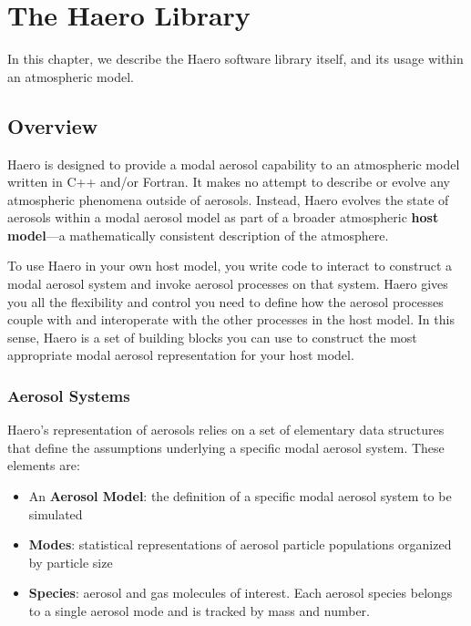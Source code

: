 \chapter{The Haero Library}

In this chapter, we describe the Haero software library itself, and its usage
within an atmospheric model.

\section{Overview}

Haero is designed to provide a modal aerosol capability to an atmospheric model
written in C++ and/or Fortran. It makes no attempt to describe or evolve any
atmospheric phenomena outside of aerosols. Instead, Haero evolves the state of
aerosols within a modal aerosol model as part of a broader atmospheric
{\bf host model}---a mathematically consistent description of the atmosphere.

To use Haero in your own host model, you write code to interact to construct
a modal aerosol system and invoke aerosol processes on that system. Haero gives
you all the flexibility and control you need to define how the aerosol processes
couple with and interoperate with the other processes in the host model. In this
sense, Haero is a set of building blocks you can use to construct the most
appropriate modal aerosol representation for your host model.

\subsection{Aerosol Systems}

Haero's representation of aerosols relies on a set of elementary data structures
that define the assumptions underlying a specific modal aerosol system. These
elements are:

\begin{itemize}
  \item An {\bf Aerosol Model}: the definition of a specific modal aerosol
        system to be simulated
  \item {\bf Modes}: statistical representations of aerosol particle populations
        organized by particle size
  \item {\bf Species}: aerosol and gas molecules of interest. Each aerosol
        species belongs to a single aerosol mode and is tracked by mass and
        number.
\end{itemize}

